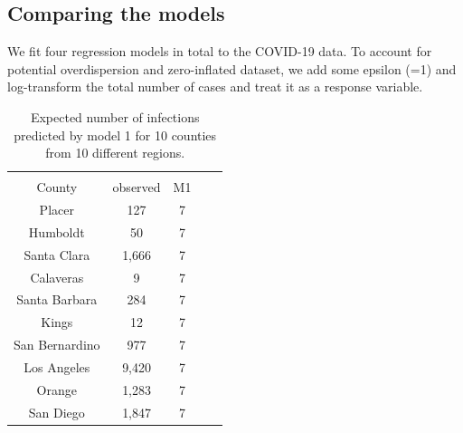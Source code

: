 \documentclass[11pt,twocolumn]{asaproc}
\begin{document}
\subsection{Comparing the models}

We fit four regression models in total to the COVID-19 data. To account for potential overdispersion and zero-inflated dataset, we add some epsilon (=1) and log-transform the total number of cases and treat it as a response variable.

\begin{table}
\caption{Expected number of infections predicted by model 1 for 10 counties from 10 different regions.}
\label{tab:infections}
\begin{center}
\begin{tabular}{ccccc}
\hline
\hline
\\[-5pt]
\multicolumn{1}{c}{County} &
\multicolumn{1}{c}{observed} &
\multicolumn{1}{c}{M1}\\
\hline
Placer&	127&   7\\
Humboldt&     50&  7 \\
Santa Clara&	1,666& 7\\
Calaveras&     9&  7\\
Santa Barbara&     284& 7\\
Kings&     12& 7\\
San Bernardino&     977& 7\\
Los Angeles&     9,420& 7\\
Orange&     1,283& 7\\
San Diego&     1,847& 7\\
\hline
\end{tabular}
\end{center}
\end{table}


\end{document}
